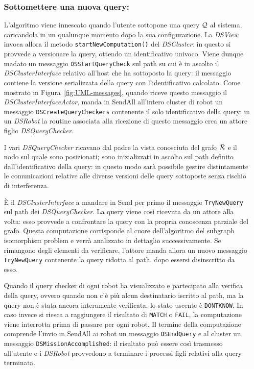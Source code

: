 \subsubsection*{Sottomettere una nuova query:}
L'algoritmo viene innescato quando l'utente sottopone una query $\mathcal{Q}$
al sistema, caricandola in un qualunque momento
dopo la sua configurazione. La \emph{DSView} invoca allora
il metodo \texttt{startNewComputation()} del \emph{DSCluster}:
in questo si provvede a versionare la query,
ottendo un identificativo univoco.
Viene dunque madato un messaggio
\texttt{DSStartQueryCheck} sul path su cui è in ascolto
il \emph{DSClusterInterface} relativo all'host che ha sottoposto
la query: il messaggio contiene la versione serializzata
della query con l'identificativo calcolato.
Come mostrato in Figura~\ref{fig:UML-messages},
quando riceve questo messaggio il \emph{DSClusterInterfaceActor},
manda in SendAll all'intero cluster di robot un messaggio
\texttt{DSCreateQueryCheckers} contenente il solo identificativo della
query: in un \emph{DSRobot} la routine associata alla ricezione
di questo messaggio crea un attore figlio \emph{DSQueryChecker}.

I vari \emph{DSQueryChecker} ricavano dal padre la vista
conosciuta del grafo $\mathcal{R}$ e il nodo sul quale sono posizionati;
sono inizializzati in ascolto sul path definito dall'identificativo
della query: in questo modo sarà possibile gestire
distintamente le comunicazioni relative alle diverse versioni delle
query sottoposte senza rischio di interferenza.

\`E il \emph{DSClusterInterface} a mandare in Send per primo
il messaggio \texttt{TryNewQuery} sul path dei \emph{DSQueryChecker}.
La query viene così ricevuta da un attore alla volta: esso provvede
a confrontare la query con la propria conoscenza parziale del grafo.
Questa computazione corrisponde al cuore dell'algoritmo del
subgraph isomorphism problem e verrà analizzato in dettaglio
successivamente.
Se rimangono degli elementi da verificare, l'attore manda allora
un nuovo messaggio \texttt{TryNewQuery} contenente la query ridotta
al path, dopo essersi disinscritto da esso.

Quando il query checker di ogni robot ha visualizzato e partecipato
alla verifica della query, ovvero quando non c'è più alcun destinatario
iscritto al path, ma la query non è stata ancora interamente verificata,
lo stato uscente è \texttt{DONTKNOW}.
In caso invece si riesca a raggiungere il risultato di \texttt{MATCH}
o \texttt{FAIL}, la computazione viene interrotta prima di passare
per ogni robot. Il termine della computazione comprende l'invio
in SendAll ai robot un messaggio \texttt{DSEndQuery} e al cluster
un messaggio \texttt{DSMissionAccomplished}:
il risultato può essere così trasmesso all'utente e i \emph{DSRobot}
provvedono a terminare i processi figli relativi alla query terminata.

